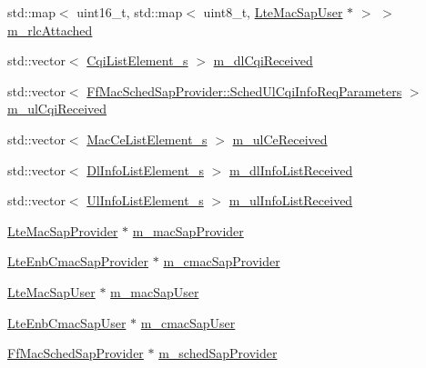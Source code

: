 \begin{DoxyCompactItemize}
\item 
std\+::map$<$ uint16\+\_\+t, std\+::map$<$ uint8\+\_\+t, \hyperlink{classns3_1_1LteMacSapUser}{Lte\+Mac\+Sap\+User} $\ast$ $>$ $>$ \hyperlink{classns3_1_1LteEnbMac_a5de3f3cae1cbc8438a7fdc5cd173a821}{m\+\_\+rlc\+Attached}
\item 
std\+::vector$<$ \hyperlink{structns3_1_1CqiListElement__s}{Cqi\+List\+Element\+\_\+s} $>$ \hyperlink{classns3_1_1LteEnbMac_a363959b047048eb81f1f49a90530ff83}{m\+\_\+dl\+Cqi\+Received}
\item 
std\+::vector$<$ \hyperlink{structns3_1_1FfMacSchedSapProvider_1_1SchedUlCqiInfoReqParameters}{Ff\+Mac\+Sched\+Sap\+Provider\+::\+Sched\+Ul\+Cqi\+Info\+Req\+Parameters} $>$ \hyperlink{classns3_1_1LteEnbMac_a663195c0f6c73d6c6aa8e578a6df032a}{m\+\_\+ul\+Cqi\+Received}
\item 
std\+::vector$<$ \hyperlink{structns3_1_1MacCeListElement__s}{Mac\+Ce\+List\+Element\+\_\+s} $>$ \hyperlink{classns3_1_1LteEnbMac_a5e182e74ebecda87f3d149da2840d4bd}{m\+\_\+ul\+Ce\+Received}
\item 
std\+::vector$<$ \hyperlink{structns3_1_1DlInfoListElement__s}{Dl\+Info\+List\+Element\+\_\+s} $>$ \hyperlink{classns3_1_1LteEnbMac_ad54d6efd653cfbfa7bd4dc6bec3b6d97}{m\+\_\+dl\+Info\+List\+Received}
\item 
std\+::vector$<$ \hyperlink{structns3_1_1UlInfoListElement__s}{Ul\+Info\+List\+Element\+\_\+s} $>$ \hyperlink{classns3_1_1LteEnbMac_afe760dd4bbfb8ce89febb8f2265edd5e}{m\+\_\+ul\+Info\+List\+Received}
\item 
\hyperlink{classns3_1_1LteMacSapProvider}{Lte\+Mac\+Sap\+Provider} $\ast$ \hyperlink{classns3_1_1LteEnbMac_a86facbadebed7c52afb947ddaf3f85ff}{m\+\_\+mac\+Sap\+Provider}
\item 
\hyperlink{classns3_1_1LteEnbCmacSapProvider}{Lte\+Enb\+Cmac\+Sap\+Provider} $\ast$ \hyperlink{classns3_1_1LteEnbMac_a7660977d320cbdd9be4b26f27aa6c515}{m\+\_\+cmac\+Sap\+Provider}
\item 
\hyperlink{classns3_1_1LteMacSapUser}{Lte\+Mac\+Sap\+User} $\ast$ \hyperlink{classns3_1_1LteEnbMac_a5df68d35afa3d4350c2a5b557dd23bdb}{m\+\_\+mac\+Sap\+User}
\item 
\hyperlink{classns3_1_1LteEnbCmacSapUser}{Lte\+Enb\+Cmac\+Sap\+User} $\ast$ \hyperlink{classns3_1_1LteEnbMac_adc8aeb0583200cc4a0923dc445a61cf2}{m\+\_\+cmac\+Sap\+User}
\item 
\hyperlink{classns3_1_1FfMacSchedSapProvider}{Ff\+Mac\+Sched\+Sap\+Provider} $\ast$ \hyperlink{classns3_1_1LteEnbMac_a48a4fe366fd18025fb8ebe4a3de2a143}{m\+\_\+sched\+Sap\+Provider}

\end{DoxyCompactItemize}
